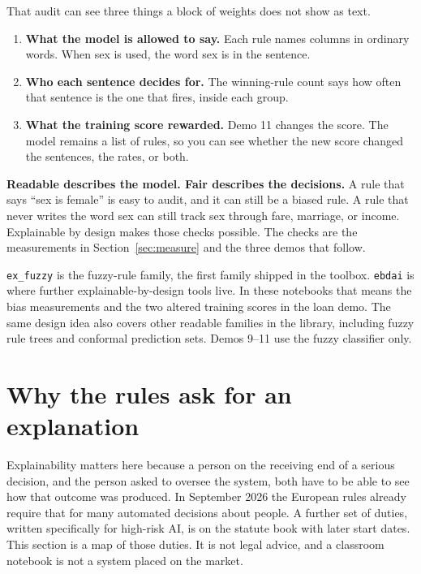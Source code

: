 \documentclass[11pt]{article}
\newcommand{\fn}[1]{\texttt{\small #1}}
\begin{document}
That audit can see three things a block of weights does not show as text.

\begin{enumerate}
  \item \textbf{What the model is allowed to say.} Each rule names columns in ordinary words. When sex is used, the word sex is in the sentence.
  \item \textbf{Who each sentence decides for.} The winning-rule count says how often that sentence is the one that fires, inside each group.
  \item \textbf{What the training score rewarded.} Demo 11 changes the score. The model remains a list of rules, so you can see whether the new score changed the sentences, the rates, or both.
\end{enumerate}

\begin{careful}
\textbf{Readable describes the model. Fair describes the decisions.} A rule that says ``sex is female'' is easy to audit, and it can still be a biased rule. A rule that never writes the word sex can still track sex through fare, marriage, or income. Explainable by design makes those checks possible. The checks are the measurements in Section~\ref{sec:measure} and the three demos that follow.
\end{careful}

\fn{ex\_fuzzy} is the fuzzy-rule family, the first family shipped in the toolbox. \fn{ebdai} is where further explainable-by-design tools live. In these notebooks that means the bias measurements and the two altered training scores in the loan demo. The same design idea also covers other readable families in the library, including fuzzy rule trees and conformal prediction sets. Demos 9--11 use the fuzzy classifier only.

\section{Why the rules ask for an explanation}
\label{sec:law}

Explainability matters here because a person on the receiving end of a serious decision, and the person asked to oversee the system, both have to be able to see how that outcome was produced. In September 2026 the European rules already require that for many automated decisions about people. A further set of duties, written specifically for high-risk AI, is on the statute book with later start dates. This section is a map of those duties. It is not legal advice, and a classroom notebook is not a system placed on the market.
\end{document}
